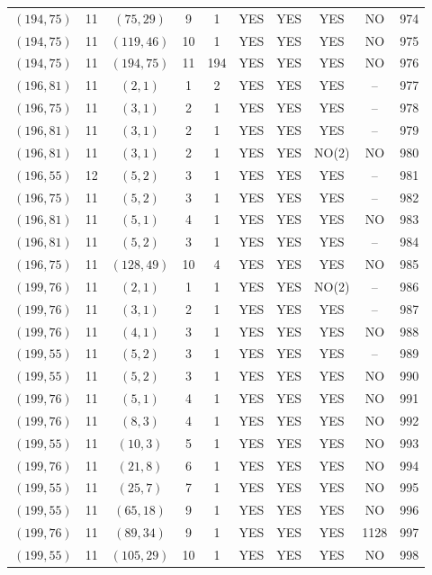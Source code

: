 \begin{longtable}{|c|c|c|c|c|c|c|c|c|c|}
$(194, 75)$ & 11 & $(75, 29)$ & 9 & 1 & YES & YES & YES & NO & 974\\
$(194, 75)$ & 11 & $(119, 46)$ & 10 & 1 & YES & YES & YES & NO & 975\\
$(194, 75)$ & 11 & $(194, 75)$ & 11 & 194 & YES & YES & YES & NO & 976\\
$(196, 81)$ & 11 & $(2, 1)$ & 1 & 2 & YES & YES & YES & -- & 977\\
$(196, 75)$ & 11 & $(3, 1)$ & 2 & 1 & YES & YES & YES & -- & 978\\
$(196, 81)$ & 11 & $(3, 1)$ & 2 & 1 & YES & YES & YES & -- & 979\\
$(196, 81)$ & 11 & $(3, 1)$ & 2 & 1 & YES & YES & NO(2) & NO & 980\\
$(196, 55)$ & 12 & $(5, 2)$ & 3 & 1 & YES & YES & YES & -- & 981\\
$(196, 75)$ & 11 & $(5, 2)$ & 3 & 1 & YES & YES & YES & -- & 982\\
$(196, 81)$ & 11 & $(5, 1)$ & 4 & 1 & YES & YES & YES & NO & 983\\
$(196, 81)$ & 11 & $(5, 2)$ & 3 & 1 & YES & YES & YES & -- & 984\\
$(196, 75)$ & 11 & $(128, 49)$ & 10 & 4 & YES & YES & YES & NO & 985\\
$(199, 76)$ & 11 & $(2, 1)$ & 1 & 1 & YES & YES & NO(2) & -- & 986\\
$(199, 76)$ & 11 & $(3, 1)$ & 2 & 1 & YES & YES & YES & -- & 987\\
$(199, 76)$ & 11 & $(4, 1)$ & 3 & 1 & YES & YES & YES & NO & 988\\
$(199, 55)$ & 11 & $(5, 2)$ & 3 & 1 & YES & YES & YES & -- & 989\\
$(199, 55)$ & 11 & $(5, 2)$ & 3 & 1 & YES & YES & YES & NO & 990\\
$(199, 76)$ & 11 & $(5, 1)$ & 4 & 1 & YES & YES & YES & NO & 991\\
$(199, 76)$ & 11 & $(8, 3)$ & 4 & 1 & YES & YES & YES & NO & 992\\
$(199, 55)$ & 11 & $(10, 3)$ & 5 & 1 & YES & YES & YES & NO & 993\\
$(199, 76)$ & 11 & $(21, 8)$ & 6 & 1 & YES & YES & YES & NO & 994\\
$(199, 55)$ & 11 & $(25, 7)$ & 7 & 1 & YES & YES & YES & NO & 995\\
$(199, 55)$ & 11 & $(65, 18)$ & 9 & 1 & YES & YES & YES & NO & 996\\
$(199, 76)$ & 11 & $(89, 34)$ & 9 & 1 & YES & YES & YES & 1128 & 997\\
$(199, 55)$ & 11 & $(105, 29)$ & 10 & 1 & YES & YES & YES & NO & 998\\

\end{longtable}

